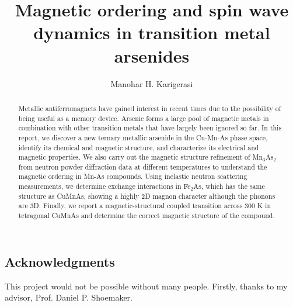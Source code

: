 \documentclass[11pt,edeposit,draftthesis]{uiucthesis2020}
\title{Magnetic ordering and spin wave dynamics in transition metal arsenides}
\author{Manohar H. Karigerasi}
\begin{document}
\maketitle


\begin{frontmatter}

\begin{abstract}
Metallic antiferromagnets have gained interest in recent times due to the possibility of being useful as a memory device. Arsenic forms a large pool of magnetic metals in combination with other transition metals that have largely been ignored so far. In this report, we discover a new ternary metallic arsenide in the Cu-Mn-As phase space, identify its chemical and magnetic structure, and characterize its electrical and magnetic properties. We also carry out the magnetic structure refinement of Mn$_3$As$_2$ from neutron powder diffraction data at different temperatures to understand the magnetic ordering in Mn-As compounds. Using inelastic neutron scattering measurements, we determine exchange interactions in Fe$_2$As, which has the same structure as CuMnAs, showing a highly 2D magnon character although the phonons are 3D. Finally, we report a magnetic-structural coupled transition across 300 K in tetragonal CuMnAs and determine the correct magnetic structure of the compound.
\end{abstract}

\chapter*{Acknowledgments}

This project would not be possible without many people. Firstly, thanks to my advisor, Prof. Daniel P. Shoemaker.


\tableofcontents
\listoftables
\listoffigures

\end{frontmatter}


\end{document}
